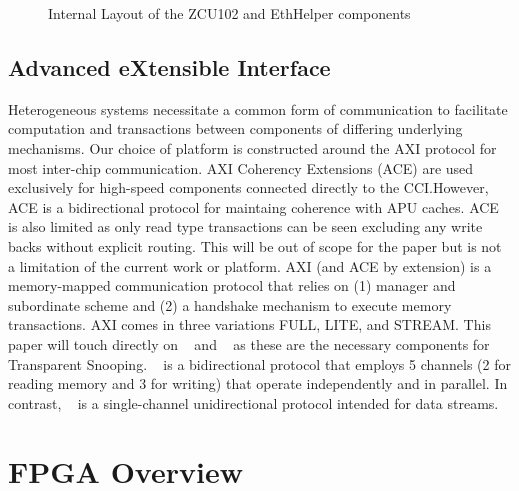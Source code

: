 \begin{figure}
    \centering
    
    \caption{Internal Layout of the ZCU102 and EthHelper components}
    \label{fig:Internal_Organization}
\end{figure}
    


\subsection{Advanced eXtensible Interface}
Heterogeneous systems necessitate a common form of communication to facilitate computation and transactions between components of differing underlying mechanisms. 
Our choice of platform is constructed around the AXI protocol for most inter-chip communication. 
AXI Coherency Extensions (ACE) are used exclusively for high-speed components connected directly to the CCI.However, ACE is a bidirectional protocol for maintaing coherence with APU caches. ACE is also limited as only read type transactions can be seen excluding any write backs without explicit routing.
This will be out of scope for the paper but is not a limitation of the current work or platform.
AXI (and ACE by extension) is a memory-mapped communication protocol that relies on (1) manager and subordinate scheme and (2) a handshake mechanism to execute memory transactions.
AXI comes in three variations FULL, LITE, and STREAM. This paper will touch directly on \axifull~ and \axistream~ as these are the necessary components for Transparent Snooping.
\axifull~ is a bidirectional protocol that employs 5 channels (2 for reading memory and 3 for writing) that operate independently and in parallel. 
In contrast, \axistream~ is a single-channel unidirectional protocol intended for data streams.

\section{FPGA Overview}


